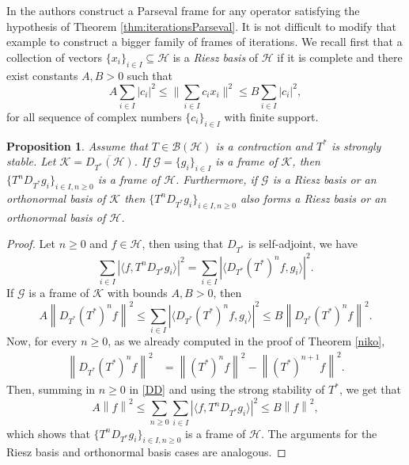 \documentclass[a4paper,12pt]{amsart}
\def\cB{{\mathcal{B}}}
\def\HH{{\mathcal{H}}}
\def\KK{{\mathcal{K}}}
\def\GG{{\mathcal{G}}}
\newcommand{\norm}[1]{{\left\|{#1}\right\|}}
\newcommand{\abs}[1]{{\left|{#1}\right|}}
\newcommand{\scal}[1]{{\langle{#1}\rangle}}
\newtheorem{proposition}[theorem]{Proposition}
\theoremstyle{definition}
\begin{document}
In \cite{AP17} the authors construct a Parseval frame for any operator satisfying the hypothesis of Theorem \ref{thm:iterationsParseval}.
It is not difficult to modify that example to construct a bigger family of frames of iterations.
We recall first that a collection of vectors $\{x_i\}_{i\in I}\subseteq\HH$ is a
{\em Riesz basis} of $\HH$ if it is complete and there exist constants $A,B>0$ such that
\begin{equation*}
A\sum_{i\in I}|c_i|^2 \leqslant \|\sum_{i\in I} c_ix_i\|^2 \leqslant B\sum_{i\in I}|c_i|^2,
\end{equation*}
for all sequence of complex numbers $\{c_i\}_{i\in I}$ with finite support.

\begin{proposition}\label{examples}
Assume that $T\in\cB(\HH)$ is a contraction and $T^*$ is strongly stable. Let  $\KK=\overline{D_{T^*}(\HH)}$. If $\GG=\{g_i\}_{i\in I}$ is a frame of $\KK$, then $\{T^nD_{T^*} g_i\}_{i\in I, n\geqslant0}$ is a frame of $\HH$. 
Furthermore, if $\GG$ is a Riesz basis or an orthonormal basis of $\KK$ then $\{T^n D_{T^*} g_i\}_{i\in I,n\geqslant0}$ also forms a Riesz basis or an orthonormal basis of $\HH$.
\end{proposition}
\begin{proof}
Let $n\geqslant 0$ and $f\in\HH$, then using that $D_{T^*}$ is self-adjoint, we have
\begin{equation*}
\sum_{i\in I}\abs{\scal{ f,T^nD_{T^*}g_i}}^2=\sum_{i\in I}\abs{\scal{ D_{T^*}(T^*)^nf, g_i}}^2.
\end{equation*}
If $\GG$ is a frame of $\KK$ with bounds $A,B>0$, then
\begin{equation}\label{DD}
A\norm{D_{T^*}(T^*)^nf}^2\leqslant\sum_{i\in I}\abs{\scal{ D_{T^*}(T^*)^nf,g_i}}^2\leqslant B\norm{D_{T^*}(T^*)^nf}^2.
\end{equation}
Now, for every $n\geqslant 0$, as we already computed  in the proof of Theorem \ref{niko},
\begin{align*}
\norm{D_{T^*}(T^*)^nf}^2 
&= 
\norm{(T^*)^nf}^2 -\norm{(T^*)^{n+1}f}^2. 
\end{align*}
Then, summing in $n\geqslant 0$ in \eqref{DD} and using the strong stability of $T^*$, we get that
\begin{equation*}
A\norm{f}^2\leqslant\sum_{n\geqslant 0 }\sum_{i\in I}\abs{\scal{ f,T^nD_{T^*}g_i}}^2\leqslant B\norm{f}^2,
\end{equation*}
which shows that $\{T^nD_{T^*} g_i\}_{i\in I,n\geqslant 0}$ is a frame of $\HH$.
The  arguments for the Riesz basis and orthonormal basis cases are analogous.
\end{proof}
\end{document}
